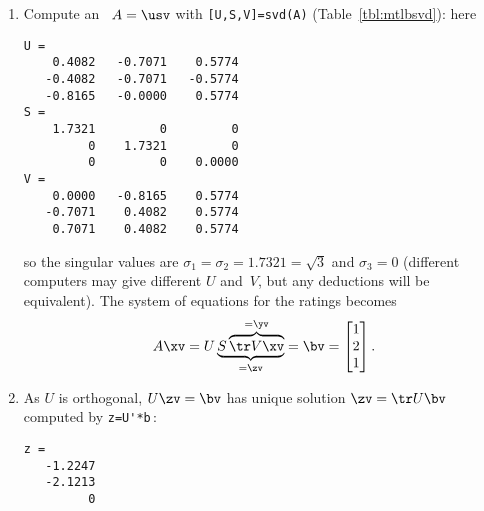 \begin{example}
\begin{solution}

\begin{enumerate}
\item Compute an \svd\ \(A=\usv\) with \verb|[U,S,V]=svd(A)| (Table~\ref{tbl:mtlbsvd}): here
\begin{verbatim}
U =
    0.4082   -0.7071    0.5774
   -0.4082   -0.7071   -0.5774
   -0.8165   -0.0000    0.5774
S =
    1.7321         0         0
         0    1.7321         0
         0         0    0.0000
V =
    0.0000   -0.8165    0.5774
   -0.7071    0.4082    0.5774
    0.7071    0.4082    0.5774
\end{verbatim}
so the singular values are \(\sigma_1=\sigma_2=1.7321=\sqrt3\) and \(\sigma_3=0\)
(different computers may give different \(U\) and~\(V\), but any deductions will be equivalent).
The system of equations for the ratings becomes
\begin{equation*}
A\xv=
U\underbrace{S\overbrace{\tr V\xv}^{=\yv}}_{=\zv}
=\bv=\begin{bmatrix} 1\\ 2\\ 1 \end{bmatrix}.
\end{equation*}

\item As \(U\) is orthogonal, \(U\zv=\bv\) has unique solution \(\zv=\tr U\bv\) computed by \verb|z=U'*b|\,:
\begin{verbatim}
z =
   -1.2247
   -2.1213
         0
\end{verbatim}



\end{enumerate}
\end{solution}
\end{example}
